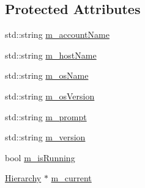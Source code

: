 \subsection*{Protected Attributes}
\begin{DoxyCompactItemize}
\item 
std\+::string \hyperlink{classApplication_ac6ecd97be07092147986a7a5965c54ec}{m\+\_\+account\+Name}
\item 
std\+::string \hyperlink{classApplication_a20094c2bf311e2046942eeeec4a11f02}{m\+\_\+host\+Name}
\item 
std\+::string \hyperlink{classApplication_a59f90c6ff4ee3db646ca656c71cc77e7}{m\+\_\+os\+Name}
\item 
std\+::string \hyperlink{classApplication_a17949f767d2598e92acb0885bb399dc0}{m\+\_\+os\+Version}
\item 
std\+::string \hyperlink{classApplication_a84f3f07f42ad77ad46cc8ef42d609948}{m\+\_\+prompt}
\item 
std\+::string \hyperlink{classApplication_acbbdbd17a3a66782c54dbbe58a9ca8d8}{m\+\_\+version}
\item 
bool \hyperlink{classApplication_ae316ea43e74cc0d536dcbb16b2fbb974}{m\+\_\+is\+Running}
\item 
\hyperlink{classHierarchy}{Hierarchy} $\ast$ \hyperlink{classApplication_ab0fd877a3c66c41b22109863e1719ccd}{m\+\_\+current}
\end{DoxyCompactItemize}

